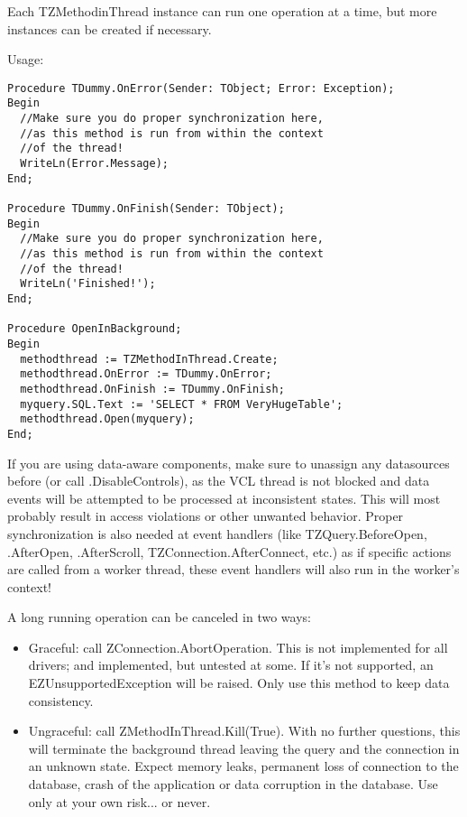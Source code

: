 \documentclass[a4paper,12pt,oneside]{report}
\begin{document}
Each TZMethodinThread instance can run one operation at a time, but more instances can be created if necessary.

Usage:

\begin{lstlisting}
Procedure TDummy.OnError(Sender: TObject; Error: Exception);
Begin
  //Make sure you do proper synchronization here,
  //as this method is run from within the context
  //of the thread!
  WriteLn(Error.Message);
End;

Procedure TDummy.OnFinish(Sender: TObject);
Begin
  //Make sure you do proper synchronization here,
  //as this method is run from within the context
  //of the thread!
  WriteLn('Finished!');
End;

Procedure OpenInBackground;
Begin
  methodthread := TZMethodInThread.Create;
  methodthread.OnError := TDummy.OnError;
  methodthread.OnFinish := TDummy.OnFinish;
  myquery.SQL.Text := 'SELECT * FROM VeryHugeTable';
  methodthread.Open(myquery);
End;
\end{lstlisting}

If you are using data-aware components, make sure to unassign any datasources before (or call .DisableControls), as the VCL thread is not blocked and data events will be attempted to be processed at inconsistent states.
This will most probably result in access violations or other unwanted behavior.
Proper synchronization is also needed at event handlers (like TZQuery.BeforeOpen, .AfterOpen, .AfterScroll, TZConnection.AfterConnect, etc.) as if specific actions are called from a worker thread, these event handlers will also run in the worker's context!

A long running operation can be canceled in two ways:
\begin{itemize}
  \item 
	  Graceful: call ZConnection.AbortOperation.
    This is not implemented for all drivers; and implemented, but untested at some.
		If it's not supported, an EZUnsupportedException will be raised.
		Only use this method to keep data consistency.
  \item
	  Ungraceful: call ZMethodInThread.Kill(True).
    With no further questions, this will terminate the background thread leaving the query and the connection in an unknown state.
		Expect memory leaks, permanent loss of connection to the database, crash of the application or data corruption in the database.
		Use only at your own risk... or never.
\end{itemize}
\end{document}
